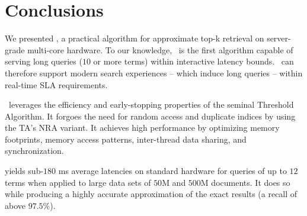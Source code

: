 \section{Conclusions}
\label{sec:conclusions}

We presented \alg, a practical algorithm for approximate top-k retrieval on server-grade multi-core hardware. 
To our knowledge, \alg\ is the first algorithm capable of serving  long queries ($10$ or more terms)
within interactive latency bounds.
\alg\ can therefore support modern search experiences -- which induce long queries -- within real-time SLA requirements. 


\alg\ leverages the efficiency and early-stopping properties of the seminal Threshold Algorithm. 
It forgoes the need for random access and duplicate indices by using the  TA's 
NRA variant. 
It achieves high performance by 
optimizing memory footprints, memory access patterns, inter-thread data sharing, and synchronization.  

\alg\/ yields sub-$180$ ms average latencies on standard hardware for queries of up to $12$ terms when applied 
to large data sets of $50$M and $500$M documents. 
  It does so while producing a highly accurate approximation of the exact results 
(a recall of above $97.5\%$). 

